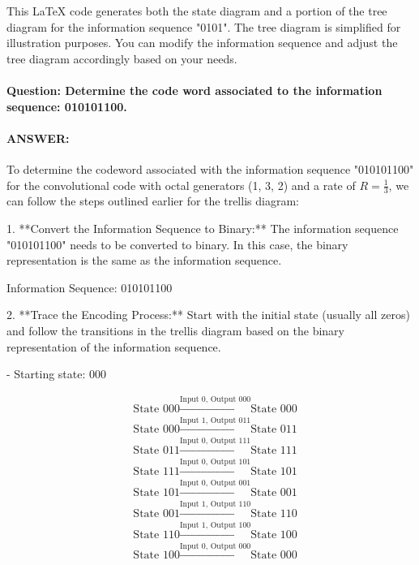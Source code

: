 \documentclass[colorlinks,11pt,a4paper,normalphoto,withhyper,ragged2e]{altareport}
\begin{document}
				
				This LaTeX code generates both the state diagram and a portion of the tree diagram for the information sequence "0101". The tree diagram is simplified for illustration purposes. You can modify the information sequence and adjust the tree diagram accordingly based on your needs.
				
				
				
				
				
				
				
				\paragraph{Question: Determine the code word associated to the information sequence: 010101100.}
				\paragraph{ANSWER:}
				To determine the codeword associated with the information sequence "010101100" for the convolutional code with octal generators (1, 3, 2) and a rate of \( R = \frac{1}{3} \), we can follow the steps outlined earlier for the trellis diagram:
				
				1. **Convert the Information Sequence to Binary:**
				The information sequence "010101100" needs to be converted to binary. In this case, the binary representation is the same as the information sequence.
				
				Information Sequence: 010101100
				
				2. **Trace the Encoding Process:**
				Start with the initial state (usually all zeros) and follow the transitions in the trellis diagram based on the binary representation of the information sequence.
				
				- Starting state: 000
				
				\[
				\begin{align*}
					&\text{State 000} \xrightarrow{\text{Input 0, Output 000}} \text{State 000} \\
					&\text{State 000} \xrightarrow{\text{Input 1, Output 011}} \text{State 011} \\
					&\text{State 011} \xrightarrow{\text{Input 0, Output 111}} \text{State 111} \\
					&\text{State 111} \xrightarrow{\text{Input 0, Output 101}} \text{State 101} \\
					&\text{State 101} \xrightarrow{\text{Input 0, Output 001}} \text{State 001} \\
					&\text{State 001} \xrightarrow{\text{Input 1, Output 110}} \text{State 110} \\
					&\text{State 110} \xrightarrow{\text{Input 1, Output 100}} \text{State 100} \\
					&\text{State 100} \xrightarrow{\text{Input 0, Output 000}} \text{State 000}
				\end{align*}
				\]
				
\end{document}

